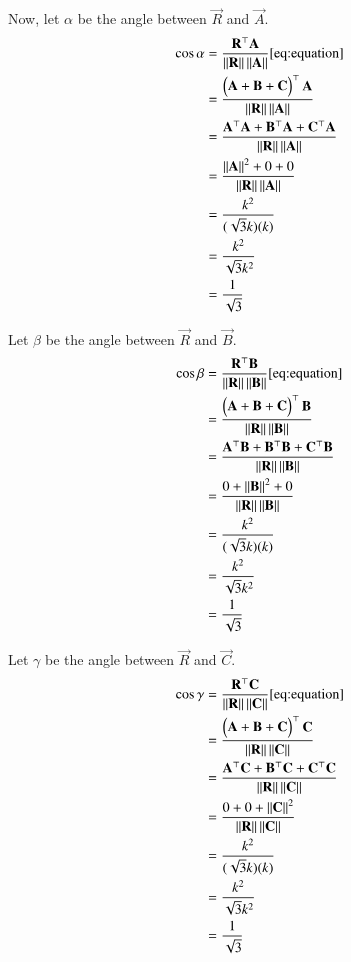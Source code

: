 \documentclass[journal]{IEEEtran}
\begin{document}
Now, let $\alpha$ be the angle between $\vec{R}$ and $\vec{A}$.
\begin{align}
\cos \alpha &= \frac{\mathbf{R}^\top \mathbf{A}}{\left\lVert\mathbf{R}\right\rVert \left\lVert\mathbf{A}\right\rVert}   \eqref{eq:equation}\\
&= \frac{\begin{pmatrix}\mathbf{A} + \mathbf{B} + \mathbf{C}\end{pmatrix}^\top \mathbf{A}}{\left\lVert\mathbf{R}\right\rVert \left\lVert\mathbf{A}\right\rVert} \\
&= \frac{\mathbf{A}^\top \mathbf{A} + \mathbf{B}^\top \mathbf{A} + \mathbf{C}^\top \mathbf{A}}{\left\lVert\mathbf{R}\right\rVert \left\lVert\mathbf{A}\right\rVert} \\
&= \frac{\left\lVert\mathbf{A}\right\rVert^2 + 0 + 0}{\left\lVert\mathbf{R}\right\rVert \left\lVert\mathbf{A}\right\rVert} \\
&= \frac{k^2}{(\sqrt{3}k)(k)} \\
&= \frac{k^2}{\sqrt{3}k^2} \\
&= \frac{1}{\sqrt{3}}
\end{align}

Let $\beta$ be the angle between $\vec{R}$ and $\vec{B}$.
\begin{align}
\cos \beta &= \frac{\mathbf{R}^\top \mathbf{B}}{\left\lVert\mathbf{R}\right\rVert \left\lVert\mathbf{B}\right\rVert}   \eqref{eq:equation} \\
&= \frac{\begin{pmatrix}\mathbf{A} + \mathbf{B} + \mathbf{C}\end{pmatrix}^\top \mathbf{B}}{\left\lVert\mathbf{R}\right\rVert \left\lVert\mathbf{B}\right\rVert} \\
&= \frac{\mathbf{A}^\top \mathbf{B} + \mathbf{B}^\top \mathbf{B} + \mathbf{C}^\top \mathbf{B}}{\left\lVert\mathbf{R}\right\rVert \left\lVert\mathbf{B}\right\rVert} \\
&= \frac{0 + \left\lVert\mathbf{B}\right\rVert^2 + 0}{\left\lVert\mathbf{R}\right\rVert \left\lVert\mathbf{B}\right\rVert} \\
&= \frac{k^2}{(\sqrt{3}k)(k)} \\
&= \frac{k^2}{\sqrt{3}k^2} \\
&= \frac{1}{\sqrt{3}}
\end{align}

Let $\gamma$ be the angle between $\vec{R}$ and $\vec{C}$.
\begin{align}
\cos \gamma &= \frac{\mathbf{R}^\top \mathbf{C}}{\left\lVert\mathbf{R}\right\rVert \left\lVert\mathbf{C}\right\rVert}   \eqref{eq:equation}\\
&= \frac{\begin{pmatrix}\mathbf{A} + \mathbf{B} + \mathbf{C}\end{pmatrix}^\top \mathbf{C}}{\left\lVert\mathbf{R}\right\rVert \left\lVert\mathbf{C}\right\rVert} \\
&= \frac{\mathbf{A}^\top \mathbf{C} + \mathbf{B}^\top \mathbf{C} + \mathbf{C}^\top \mathbf{C}}{\left\lVert\mathbf{R}\right\rVert \left\lVert\mathbf{C}\right\rVert} \\
&= \frac{0 + 0 + \left\lVert\mathbf{C}\right\rVert^2}{\left\lVert\mathbf{R}\right\rVert \left\lVert\mathbf{C}\right\rVert} \\
&= \frac{k^2}{(\sqrt{3}k)(k)} \\
&= \frac{k^2}{\sqrt{3}k^2} \\
&= \frac{1}{\sqrt{3}}
\end{align}
\end{document}

